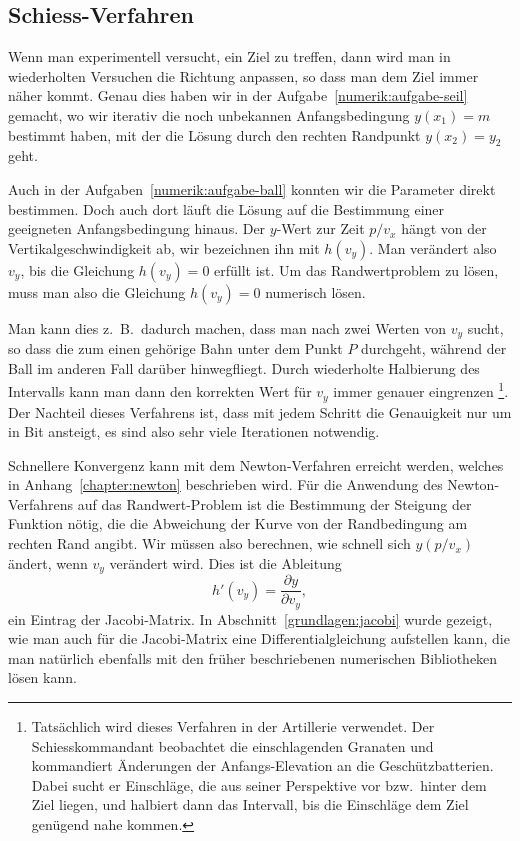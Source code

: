 \subsection{Schiess-Verfahren\label{numerik:schiess-verfahren}}
%
Wenn man experimentell versucht, ein Ziel zu treffen, dann wird man
in wiederholten Versuchen die Richtung anpassen, so dass man dem Ziel
immer näher kommt.
Genau dies haben wir in der Aufgabe~\ref{numerik:aufgabe-seil} gemacht,
wo wir iterativ die noch unbekannen Anfangsbedingung $y(x_1)=m$ bestimmt
haben, mit der die Lösung durch den rechten Randpunkt $y(x_2)=y_2$ geht.

Auch in der Aufgaben~\ref{numerik:aufgabe-ball} konnten wir die
Parameter direkt bestimmen.
Doch auch dort läuft die Lösung auf die Bestimmung einer 
geeigneten Anfangsbedingung hinaus.
Der $y$-Wert zur Zeit $p/v_x$ hängt von der Vertikalgeschwindigkeit ab,
wir bezeichnen ihn mit $h(v_y)$.
Man verändert also $v_y$, bis die Gleichung $h(v_y)=0$ erfüllt ist.
Um das Randwertproblem zu lösen, muss man also die Gleichung $h(v_y)=0$
numerisch lösen.

Man kann dies z.~B.~dadurch machen, dass man nach zwei Werten von $v_y$
sucht, so dass die zum einen gehörige Bahn unter dem Punkt $P$ durchgeht,
während der Ball im anderen Fall darüber hinwegfliegt.
Durch wiederholte Halbierung des Intervalls kann man dann den korrekten
Wert für $v_y$ immer genauer eingrenzen%
\footnote{%
Tatsächlich wird dieses Verfahren in der Artillerie verwendet.
%
Der Schiesskommandant beobachtet die einschlagenden Granaten und kommandiert
Änderungen der Anfangs-Elevation an die Geschützbatterien.
Dabei sucht er Einschläge, die aus seiner Perspektive vor bzw.~hinter
dem Ziel liegen, und halbiert dann das Intervall, bis die Einschläge dem
Ziel genügend nahe kommen.}.
Der Nachteil dieses Verfahrens ist, dass mit jedem Schritt die Genauigkeit
nur um in Bit ansteigt, es sind also sehr viele Iterationen notwendig.

Schnellere Konvergenz kann mit dem Newton-Verfahren erreicht werden,
welches in Anhang~\ref{chapter:newton} beschrieben wird.
%
Für die Anwendung des Newton-Verfahrens auf das Randwert-Problem
ist die Bestimmung der Steigung der Funktion nötig, die die Abweichung
der Kurve von der Randbedingung am rechten Rand angibt.
Wir müssen also berechnen, wie schnell sich $y(p/v_x)$ ändert,
wenn $v_y$ verändert wird.
Dies ist die Ableitung
\[
h'(v_y)= \frac{\partial y}{\partial v_y},
\]
ein Eintrag der Jacobi-Matrix.
In Abschnitt~\ref{grundlagen:jacobi} wurde gezeigt, wie man auch für
die Jacobi-Matrix eine Differentialgleichung aufstellen kann, die
man natürlich ebenfalls mit den früher beschriebenen numerischen
Bibliotheken lösen kann.

